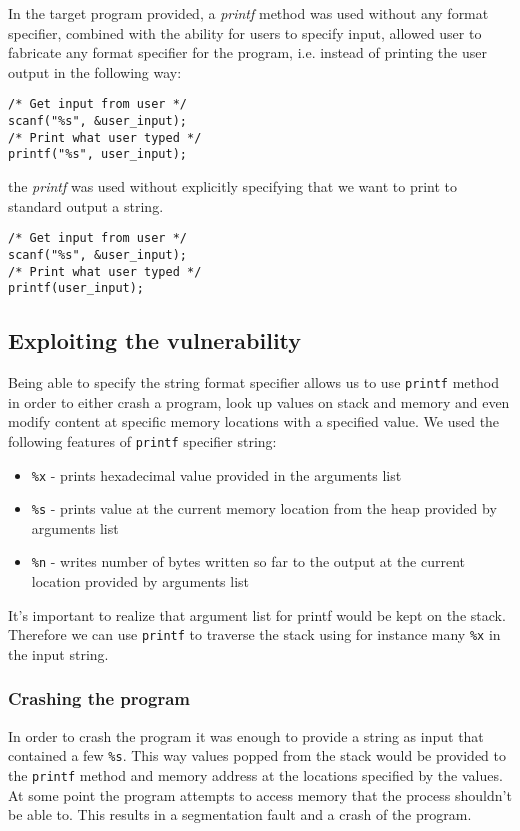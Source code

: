 \documentclass[12pt, a4paper, pdflatex]{article}
\begin{document}
In the target program provided, a \emph{printf} method was used without any format specifier, combined with the ability for users to specify input, allowed user to fabricate any format specifier for the program, i.e. instead of printing the user output in the following way:
\vspace{1em}
\lstset{
	captionpos=b,
	frame=single,
	language=C,
  breaklines=true,
	caption=Fragment of code that would not include the vulnerability,
	label=chroot:vul,
  float=tb
}
\begin{lstlisting}
/* Get input from user */
scanf("%s", &user_input);
/* Print what user typed */
printf("%s", user_input);
\end{lstlisting}
the \emph{printf} was used without explicitly specifying that we want to print to standard output a string.
\vspace{1em}
\lstset{
	captionpos=b,
	frame=single,
	language=C,
  breaklines=true,
	caption=Fragment of includes the vulnerability,
	label=chroot:vul2,
  float=tb
}
\begin{lstlisting}
/* Get input from user */
scanf("%s", &user_input);
/* Print what user typed */
printf(user_input);
\end{lstlisting}


\subsection{Exploiting the vulnerability}
Being able to specify the string format specifier allows us to use \texttt{printf} method in order to either crash a program, look up values on stack and memory and even modify content at specific memory locations with a specified value. We used the following features of \texttt{printf} specifier string:
\begin{itemize}
	\item \texttt{\%x} - prints hexadecimal value provided in the arguments list
	\item \texttt{\%s} - prints value at the current memory location from the heap provided by arguments list
	\item \texttt{\%n} - writes number of bytes written so far to the output at the current location provided by arguments list
\end{itemize}
It's important to realize that argument list for printf would be kept on the stack. Therefore we can use \texttt{printf} to traverse the stack using for instance many \texttt{\%x} in the input string.

\subsubsection{Crashing the program}
In order to crash the program it was enough to provide a string as input that contained a few \texttt{\%s}. This way values popped from the stack would be provided to the \texttt{printf} method and memory address at the locations specified by the values. At some point the program attempts to access memory that the process shouldn't be able to. This results in a segmentation fault and a crash of the program.
\end{document}
